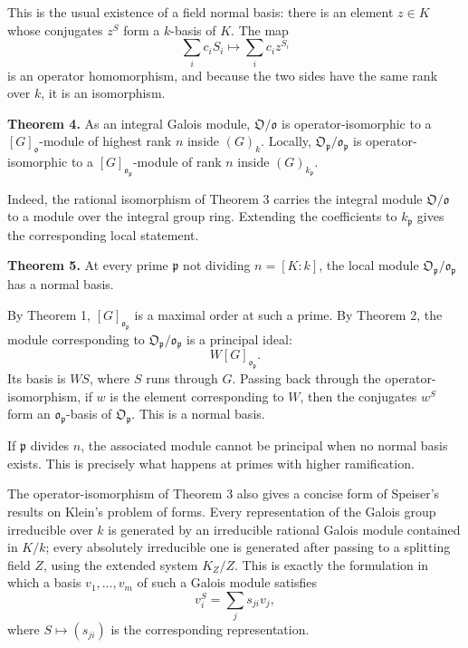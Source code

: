 \documentclass[
  11pt,
]{article}
\begin{document}
This is the usual existence of a field normal basis: there is an element
\(z\in K\) whose conjugates \(z^S\) form a \(k\)-basis of \(K\). The map
\[
  \sum_i c_iS_i\longmapsto \sum_i c_i z^{S_i}
\] is an operator homomorphism, and because the two sides have the same
rank over \(k\), it is an isomorphism.

\textbf{Theorem 4.} As an integral Galois module,
\(\mathfrak O/\mathfrak o\) is operator-isomorphic to a
\([G]_{\mathfrak o}\)-module of highest rank \(n\) inside \((G)_k\).
Locally, \(\mathfrak O_{\mathfrak p}/\mathfrak o_{\mathfrak p}\) is
operator-isomorphic to a \([G]_{\mathfrak o_{\mathfrak p}}\)-module of
rank \(n\) inside \((G)_{k_{\mathfrak p}}\).

Indeed, the rational isomorphism of Theorem 3 carries the integral
module \(\mathfrak O/\mathfrak o\) to a module over the integral group
ring. Extending the coefficients to \(k_{\mathfrak p}\) gives the
corresponding local statement.

\textbf{Theorem 5.} At every prime \(\mathfrak p\) not dividing
\(n=[K:k]\), the local module
\(\mathfrak O_{\mathfrak p}/\mathfrak o_{\mathfrak p}\) has a normal
basis.

By Theorem 1, \([G]_{\mathfrak o_{\mathfrak p}}\) is a maximal order at
such a prime. By Theorem 2, the module corresponding to
\(\mathfrak O_{\mathfrak p}/\mathfrak o_{\mathfrak p}\) is a principal
ideal: \[
  W [G]_{\mathfrak o_{\mathfrak p}}.
\] Its basis is \(WS\), where \(S\) runs through \(G\). Passing back
through the operator-isomorphism, if \(w\) is the element corresponding
to \(W\), then the conjugates \(w^S\) form an
\(\mathfrak o_{\mathfrak p}\)-basis of \(\mathfrak O_{\mathfrak p}\).
This is a normal basis.

If \(\mathfrak p\) divides \(n\), the associated module cannot be
principal when no normal basis exists. This is precisely what happens at
primes with higher ramification.

The operator-isomorphism of Theorem 3 also gives a concise form of
Speiser's results on Klein's problem of forms. Every representation of
the Galois group irreducible over \(k\) is generated by an irreducible
rational Galois module contained in \(K/k\); every absolutely
irreducible one is generated after passing to a splitting field \(Z\),
using the extended system \(K_Z/Z\). This is exactly the formulation in
which a basis \(v_1,
\ldots,v_m\) of such a Galois module satisfies \[
  v_i^S=\sum_j s_{ji}v_j,
\] where \(S\mapsto(s_{ji})\) is the corresponding representation.
\end{document}
